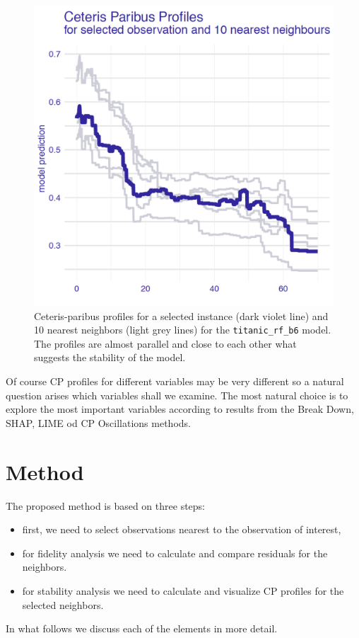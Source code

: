 \documentclass[]{krantz}
\providecommand{\tightlist}{%
  \setlength{\itemsep}{0pt}\setlength{\parskip}{0pt}}
\begin{document}
\begin{figure}

{\centering \includegraphics[width=0.5\linewidth]{figure/example_cp} 

}

\caption{Ceteris-paribus profiles for a selected instance (dark violet line) and 10 nearest neighbors (light grey lines) for the \texttt{titanic\_rf\_b6} model. The profiles are almost parallel and close to each other what suggests the stability of the model.}\label{fig:profileWith10NN}
\end{figure}

Of course CP profiles for different variables may be very different so a natural question arises which variables shall we examine. The most natural choice is to explore the most important variables according to results from the Break Down, SHAP, LIME od CP Oscillations methods.

\hypertarget{cPLocDiagMethod}{%
\section{Method}\label{cPLocDiagMethod}}

The proposed method is based on three steps:

\begin{itemize}
\tightlist
\item
  first, we need to select observations nearest to the observation of interest,
\item
  for fidelity analysis we need to calculate and compare residuals for the neighbors.
\item
  for stability analysis we need to calculate and visualize CP profiles for the selected neighbors.
\end{itemize}

In what follows we discuss each of the elements in more detail.
\end{document}

